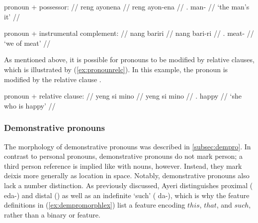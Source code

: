 \a\ljudge* %
	\begin{minipage}[t]{.5\linewidth}
	\begingl
		\glpreamble pronoun + possessor: //
		\gla reng ayonena //
		\glb reng ayon-ena //
		\glc \TsgI{}.\Aarg{} man-\Gen{} //
		\glft `the man's it' //
	\endgl
	\end{minipage}

\a\ljudge* %
	\begin{minipage}[t]{.5\linewidth}
	\begingl
		\glpreamble pronoun + instrumental complement: //
		\gla nang bariri //
		\glb nang bari-ri //
		\glc \Fpl{}.\Aarg{} meat-\Ins{} //
		\glft `we of meat' //
	\endgl
	\end{minipage}

\xe

As mentioned above, it is possible for pronouns to be modified by relative
clauses, which is illustrated by (\ref{ex:pronounrelc}). In this example, the
pronoun  is modified by the relative clause .

\ex\label{ex:pronounrelc} %
	\begin{minipage}[t]{.5\linewidth}
	\begingl
		\glpreamble pronoun + relative clause: //
		\gla yeng si mino //
		\glb yeng si mino //
		\glc \TsgF{}.\Aarg{} \Rel{} happy //
		\glft `she who is happy' //
	\endgl
	\end{minipage}
\xe

\subsubsection{Demonstrative pronouns}

The morphology of demonstrative pronouns was described in 
\autoref{subsec:dempro}. In contrast to personal pronouns, demonstrative
pronouns do not mark person; a third person reference is implied like with
nouns, however. Instead, they mark deixis more generally as location in space.
Notably, demonstrative pronouns also lack a number distinction. As previously
discussed, Ayeri distinguishes proximal ( {eda-}) and distal
() as well as an indefinite `such' ( {da-}), which is
why the feature definitions in (\ref{ex:dempromorphlex}) list a \Deix{} feature
encoding $this$, $that$, and $such$, rather than a binary \Prox{} or \Dist{}
feature.

